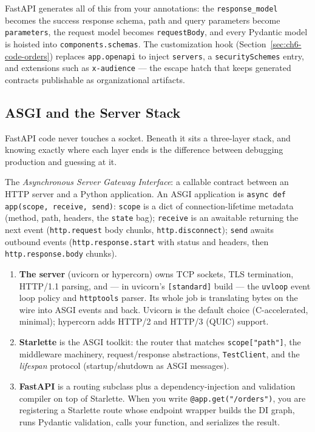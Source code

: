 FastAPI generates all of this from your annotations: the
\texttt{response\_model} becomes the success response schema, path and query
parameters become \texttt{parameters}, the request model becomes
\texttt{requestBody}, and every Pydantic model is hoisted into
\texttt{components.schemas}. The customization hook
(Section~\ref{sec:ch6-code-orders}) replaces \texttt{app.openapi} to inject
\texttt{servers}, a \texttt{securitySchemes} entry, and extensions such as
\texttt{x-audience} --- the escape hatch that keeps generated contracts
publishable as organizational artifacts.

\subsection{ASGI and the Server Stack}
\label{sec:ch6-asgi}

FastAPI code never touches a socket. Beneath it sits a three-layer stack, and
knowing exactly where each layer ends is the difference between debugging
production and guessing at it.

\begin{definition}[ASGI]
The \emph{Asynchronous Server Gateway Interface}: a callable contract between
an HTTP server and a Python application. An ASGI application is
\texttt{async def app(scope, receive, send)}: \texttt{scope} is a dict of
connection-lifetime metadata (method, path, headers, the \texttt{state} bag);
\texttt{receive} is an awaitable returning the next event
(\texttt{http.request} body chunks, \texttt{http.disconnect});
\texttt{send} awaits outbound events (\texttt{http.response.start} with
status and headers, then \texttt{http.response.body} chunks).
\end{definition}

\begin{enumerate}
  \item \textbf{The server} (uvicorn or hypercorn) owns TCP sockets, TLS
        termination, HTTP/1.1 parsing, and --- in uvicorn's
        \texttt{[standard]} build --- the \texttt{uvloop} event loop policy
        and \texttt{httptools} parser. Its whole job is translating bytes on
        the wire into ASGI events and back. Uvicorn is the default choice
        (C-accelerated, minimal); hypercorn adds HTTP/2 and HTTP/3 (QUIC)
        support.
  \item \textbf{Starlette} is the ASGI toolkit: the router that matches
        \texttt{scope["path"]}, the middleware machinery, request/response
        abstractions, \texttt{TestClient}, and the \emph{lifespan} protocol
        (startup/shutdown as ASGI messages).
  \item \textbf{FastAPI} is a routing subclass plus a dependency-injection
        and validation compiler on top of Starlette. When you write
        \texttt{@app.get("/orders")}, you are registering a Starlette route
        whose endpoint wrapper builds the DI graph, runs Pydantic validation,
        calls your function, and serializes the result.
\end{enumerate}

